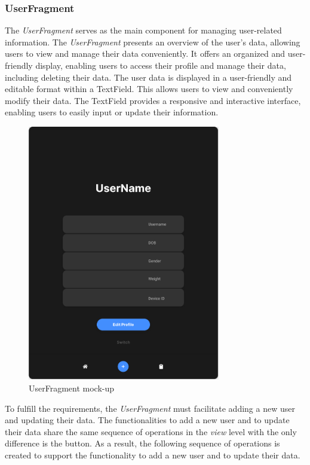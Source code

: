 \subsubsection{UserFragment}
The \emph{UserFragment} serves as the main component for managing user-related information. 
The \emph{UserFragment} presents an overview of the user's data, allowing users to view and manage their data conveniently. 
It offers an organized and user-friendly display, enabling users to access their profile and manage their data, including deleting their data.
The user data is displayed in a user-friendly and editable format within a TextField. This allows users to view and conveniently modify their data. 
The TextField provides a responsive and interactive interface, enabling users to easily input or update their information. 

\begin{figure}[H]
    \centering
    \includegraphics[width=0.75\textwidth]{images/user-fragment-mockup.png}
    \caption{UserFragment mock-up}
    \label{fig:userfragment_mockup}
\end{figure}

To fulfill the requirements, the \emph{UserFragment} must facilitate adding a new user and updating their data. The functionalities to add a new user and to update their data share the same sequence of operations in the \emph{view} level with the only difference is the button.
As a result, the following sequence of operations is created to support the functionality to add a new user and to update their data.

